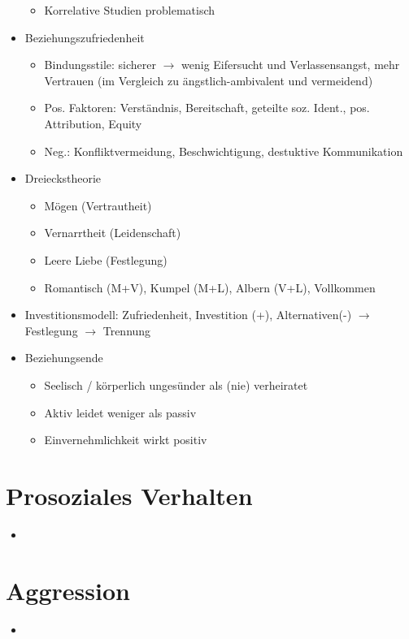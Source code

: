 \documentclass[11pt, paper=a4, twocolumn]{scrartcl}
\begin{document}
\begin{itemize}
\begin{itemize}
					\item Korrelative Studien problematisch
				\end{itemize}
			\item Beziehungszufriedenheit
				\begin{itemize}
					\item Bindungsstile: sicherer $\rightarrow$ wenig Eifersucht und Verlassensangst, mehr Vertrauen (im Vergleich 
						zu ängstlich-ambivalent und vermeidend)
					\item Pos. Faktoren: Verständnis, Bereitschaft, geteilte soz. Ident., pos. Attribution, Equity
					\item Neg.: Konfliktvermeidung, Beschwichtigung, destuktive Kommunikation
				\end{itemize}
			\item Dreieckstheorie
				\begin{itemize}
					\item Mögen (Vertrautheit)
					\item Vernarrtheit (Leidenschaft)
					\item Leere Liebe (Festlegung)
					\item Romantisch (M+V), Kumpel (M+L), Albern (V+L), Vollkommen
				\end{itemize}
			\item Investitionsmodell: Zufriedenheit, Investition (+), Alternativen(-) $\rightarrow$ Festlegung $\rightarrow$ Trennung
			\item Beziehungsende
				\begin{itemize}
					\item Seelisch / körperlich ungesünder als (nie) verheiratet
					\item Aktiv leidet weniger als passiv
					\item Einvernehmlichkeit wirkt positiv
				\end{itemize}
		\end{itemize}



	\section{Prosoziales Verhalten}
		\begin{itemize}
			\item
		\end{itemize}



	\section{Aggression}
		\begin{itemize}
			\item
		\end{itemize}
\end{document}
